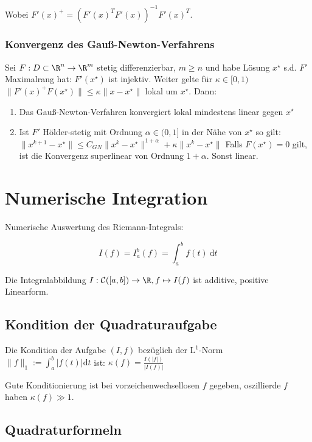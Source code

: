 Wobei $F'(x)^+ = (F'(x)^T F'(x))^{-1} F'(x)^T$.

\subsubsection*{Konvergenz des Gauß-Newton-Verfahrens}

Sei $F : D \subset \R^n \to \R^m$ stetig differenzierbar, $m \geq n$ und habe Lösung $x^\star$ s.d. $F'$ Maximalrang hat: $F'(x^\star)$ ist injektiv. Weiter gelte für $\kappa \in [0,1)$ $\|F'(x)^+ F(x^\star)\| \leq \kappa \|x-x^\star\|$ lokal um $x^\star$. Dann:

\begin{enumerate}[label=(\alph*)]
	\item Das Gauß-Newton-Verfahren konvergiert lokal mindestens linear gegen $x^\star$
	\item Ist $F'$ Hölder-stetig mit Ordnung $\alpha \in (0,1]$ in der Nähe von $x^\star$ so gilt: \\ $\|x^{k+1}-x^\star\| \leq C_{GN}\|x^k-x^\star\|^{1+\alpha} + \kappa\|x^k-x^\star\|$ Falls $F(x^\star) = 0$ gilt, ist die Konvergenz superlinear von Ordnung $1+\alpha$. Sonst linear.
\end{enumerate}

\section*{Numerische Integration}

Numerische Auswertung des Riemann-Integrals:

\vspace*{-2mm}
\[ I(f) = I_a^b(f) = \int_a^b f(t) \ \text{d}t \]

Die Integralabbildung $I : \mathcal{C}([a,b]) \to \R, f \mapsto I(f)$ ist additive, positive Linearform.

\subsection*{Kondition der Quadraturaufgabe}

Die Kondition der Aufgabe $(I,f)$ bezüglich der $\text{L}^1$-Norm $\|f\|_1 := \int_a^b |f(t)| \text{d}t$ ist: $\kappa(f) = \frac{I(|f|)}{|I(f)|}$

Gute Konditionierung ist bei vorzeichenwechsellosen $f$ gegeben, oszillierde $f$ haben $\kappa(f) \gg 1$.

\subsection*{Quadraturformeln}

